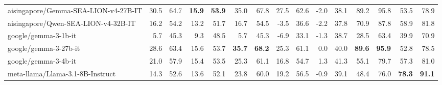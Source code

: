 \documentclass{article}
\begin{document}
\begin{table}[htbp]
\begin{threeparttable}
\begin{adjustbox}{max width=\textwidth}
\begin{tabular}{lrrrrrrrrrrrrrr}
aisingapore/Gemma-SEA-LION-v4-27B-IT & \cellcolor[HTML]{A1CDE2}30.5 & \cellcolor[HTML]{9FCCE2}64.7 & \cellcolor[HTML]{92C5DE}\textbf{15.9} & \cellcolor[HTML]{92C5DE}\textbf{53.9} & \cellcolor[HTML]{96C7DF}35.0 & \cellcolor[HTML]{95C6DF}67.8 & \cellcolor[HTML]{A8D0E4}27.5 & \cellcolor[HTML]{A3CEE3}62.6 & \cellcolor[HTML]{FDF4F1}-2.0 & \cellcolor[HTML]{FEF7F4}38.1 & \cellcolor[HTML]{93C5DE}89.2 & \cellcolor[HTML]{92C5DE}95.8 & \cellcolor[HTML]{E0EEF5}53.5 & \cellcolor[HTML]{D0E6F0}78.9 \\
aisingapore/Qwen-SEA-LION-v4-32B-IT & \cellcolor[HTML]{FCEBE4}16.2 & \cellcolor[HTML]{FDF1EC}54.2 & \cellcolor[HTML]{CFE5F0}13.2 & \cellcolor[HTML]{CCE4EF}51.7 & \cellcolor[HTML]{FDF5F1}16.7 & \cellcolor[HTML]{FEFDFD}54.5 & \cellcolor[HTML]{F9CFBC}-3.5 & \cellcolor[HTML]{FAD8C9}36.6 & \cellcolor[HTML]{FDEFEA}-2.2 & \cellcolor[HTML]{FDF2ED}37.8 & \cellcolor[HTML]{C7E1EE}70.9 & \cellcolor[HTML]{BADAEA}87.8 & \cellcolor[HTML]{CEE5F0}58.9 & \cellcolor[HTML]{C1DEEC}81.8 \\
google/gemma-3-1b-it & \cellcolor[HTML]{F4A582}5.7 & \cellcolor[HTML]{F4A582}45.3 & \cellcolor[HTML]{FADDD0}9.3 & \cellcolor[HTML]{FBDFD3}48.5 & \cellcolor[HTML]{F6BBA1}5.7 & \cellcolor[HTML]{F7BFA7}45.3 & \cellcolor[HTML]{F7C1A9}-6.9 & \cellcolor[HTML]{F8C8B3}33.1 & \cellcolor[HTML]{F8FBFD}-1.3 & \cellcolor[HTML]{F6FAFC}38.7 & \cellcolor[HTML]{F8C7B2}28.5 & \cellcolor[HTML]{F9D2C1}63.4 & \cellcolor[HTML]{FDF5F1}39.9 & \cellcolor[HTML]{F8FBFD}70.9 \\
google/gemma-3-27b-it & \cellcolor[HTML]{B1D5E7}28.6 & \cellcolor[HTML]{ADD3E6}63.4 & \cellcolor[HTML]{98C8E0}15.6 & \cellcolor[HTML]{98C8DF}53.7 & \cellcolor[HTML]{92C5DE}\textbf{35.7} & \cellcolor[HTML]{92C5DE}\textbf{68.2} & \cellcolor[HTML]{B2D6E7}25.3 & \cellcolor[HTML]{ABD2E5}61.1 & \cellcolor[HTML]{D4E8F2}0.0 & \cellcolor[HTML]{D2E7F1}40.0 & \cellcolor[HTML]{92C5DE}\textbf{89.6} & \cellcolor[HTML]{92C5DE}\textbf{95.9} & \cellcolor[HTML]{E2EFF6}52.8 & \cellcolor[HTML]{D2E7F1}78.5 \\
google/gemma-3-4b-it & \cellcolor[HTML]{EFF6FA}21.0 & \cellcolor[HTML]{E7F2F7}57.9 & \cellcolor[HTML]{9CCAE1}15.4 & \cellcolor[HTML]{9BCAE0}53.5 & \cellcolor[HTML]{D3E7F1}25.3 & \cellcolor[HTML]{CBE3EF}61.1 & \cellcolor[HTML]{DAEBF3}16.8 & \cellcolor[HTML]{CDE4F0}54.7 & \cellcolor[HTML]{B0D5E7}1.3 & \cellcolor[HTML]{AFD4E6}41.3 & \cellcolor[HTML]{F5F9FC}55.1 & \cellcolor[HTML]{E2F0F6}79.7 & \cellcolor[HTML]{D3E8F1}57.3 & \cellcolor[HTML]{C5E0ED}81.0 \\
meta-llama/Llama-3.1-8B-Instruct & \cellcolor[HTML]{FBDED2}14.3 & \cellcolor[HTML]{FBE4DA}52.6 & \cellcolor[HTML]{C5E0ED}13.6 & \cellcolor[HTML]{C3DFEC}52.1 & \cellcolor[HTML]{DDECF4}23.8 & \cellcolor[HTML]{D4E8F2}60.0 & \cellcolor[HTML]{CFE5F0}19.2 & \cellcolor[HTML]{C4DFED}56.5 & \cellcolor[HTML]{ECF5F9}-0.9 & \cellcolor[HTML]{EAF3F8}39.1 & \cellcolor[HTML]{FEF7F3}48.4 & \cellcolor[HTML]{F5F9FC}76.0 & \cellcolor[HTML]{92C5DE}\textbf{78.3} & \cellcolor[HTML]{92C5DE}\textbf{91.1} \\

\end{tabular}
\end{adjustbox}
\end{threeparttable}
\end{table}
\end{document}
